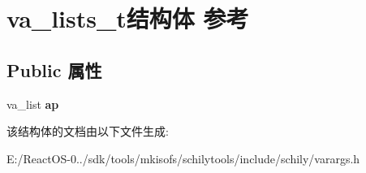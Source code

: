 \hypertarget{structva__lists__t}{}\section{va\+\_\+lists\+\_\+t结构体 参考}
\label{structva__lists__t}
\subsection*{Public 属性}
\begin{DoxyCompactItemize}
\item 
\mbox{\label{structva__lists__t_a5dbb73ab5b4a150800fa9eb48ec0b20b}} 
va\+\_\+list {\bfseries ap}
\end{DoxyCompactItemize}


该结构体的文档由以下文件生成\+:\begin{DoxyCompactItemize}
\item 
E\+:/\+React\+O\+S-\/0../sdk/tools/mkisofs/schilytools/include/schily/varargs.\+h\end{DoxyCompactItemize}
